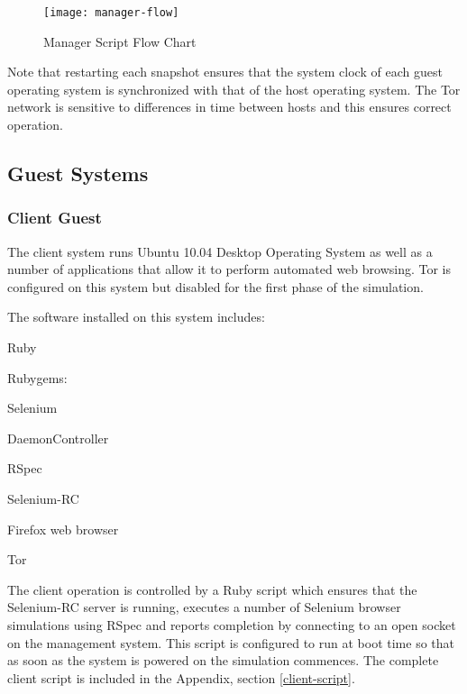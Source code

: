 \begin{figure}[H]
  \centering\texttt{[image: manager-flow]}
  \caption{Manager Script Flow Chart}
  \label{manager-flow-diagram}
\end{figure}

Note that restarting each snapshot ensures that the system clock of each guest
operating system is synchronized with that of the host operating system. The
Tor network is sensitive to differences in time between hosts and this ensures
correct operation.

\subsection{Guest Systems}

\subsubsection{Client Guest}

The client system runs Ubuntu 10.04 Desktop Operating System as well as a
number of applications that allow it to perform automated web browsing. Tor is
configured on this system but disabled for the first phase of the simulation.

The software installed on this system includes:

\begin{itemize*}
  \item Ruby
  \item Rubygems:
    \begin{itemize*}
      \item Selenium
      \item DaemonController
      \item RSpec
    \end{itemize*}
  \item Selenium-RC
  \item Firefox web browser
  \item Tor
\end{itemize*}

The client operation is controlled by a Ruby script which ensures that the
Selenium-RC server is running, executes a number of Selenium browser simulations
using RSpec and reports completion by connecting to an open socket on the
management system. This script is configured to run at boot time so that as soon
as the system is powered on the simulation commences. The complete client script
is included in the Appendix, section \ref{client-script}.

